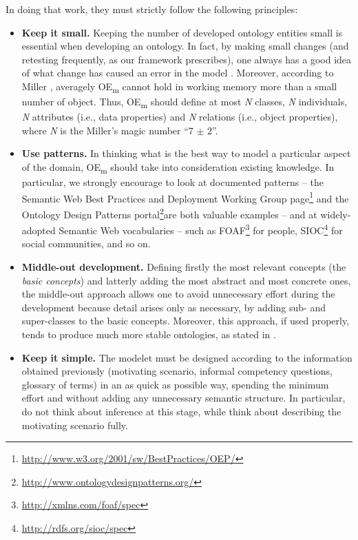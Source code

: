 \documentclass[runningheads,a4paper]{llncs}
\begin{document}
In doing that work, they must strictly follow the following principles:
\begin{itemize}
\item {\bf Keep it small.} Keeping the number of developed ontology entities small is essential when developing an ontology. In fact, by making small changes (and retesting frequently, as our framework prescribes), one always has a good idea of what change has caused an error in the model  \cite{__RefNumPara__2367_1461357291}. Moreover, according to Miller  \cite{__RefNumPara__2760_1461357291}, averagely OE\textsubscript{m} cannot hold in working memory more than a small number of object. Thus, OE\textsubscript{m} should define at most {\em N} classes, {\em N} individuals, {\em N} attributes (i.e., data properties) and {\em N} relations (i.e., object properties), where {\em N} is the Miller's magic number ``7 $\pm$ 2''.
\item {\bf Use patterns.} In thinking what is the best way to model a particular aspect of the domain, OE\textsubscript{m} should take into consideration existing knowledge. In particular, we strongly encourage to look at documented patterns -- the Semantic Web Best Practices and Deployment Working Group page\footnote{\url{http://www.w3.org/2001/sw/BestPractices/OEP/}} and the Ontology Design Patterns portal\footnote{\url{http://www.ontologydesignpatterns.org/}}{\em }are both valuable examples -- and at widely-adopted Semantic Web vocabularies -- such as FOAF\footnote{\url{http://xmlns.com/foaf/spec}} for people, SIOC\footnote{\url{http://rdfs.org/sioc/spec}} for social communities, and so on.
\item {\bf Middle-out development.} Defining firstly the most relevant concepts (the {\em basic concepts}) and latterly adding the most abstract and most concrete ones, the middle-out approach  \cite{__RefNumPara__2884_1461357291} allows one to avoid unnecessary effort during the development because detail arises only as necessary, by adding sub- and super-classes to the basic concepts. Moreover, this approach, if used properly, tends to produce much more stable ontologies, as stated in  \cite{__RefNumPara__2389_1461357291}.
\item {\bf Keep it simple.} The modelet must be designed according to the information obtained previously (motivating scenario, informal competency questions, glossary of terms) in an as quick as possible way, spending the minimum effort and without adding any unnecessary semantic structure. In particular, do not think about inference at this stage, while think about describing the motivating scenario fully.

\end{itemize}
\end{document}
